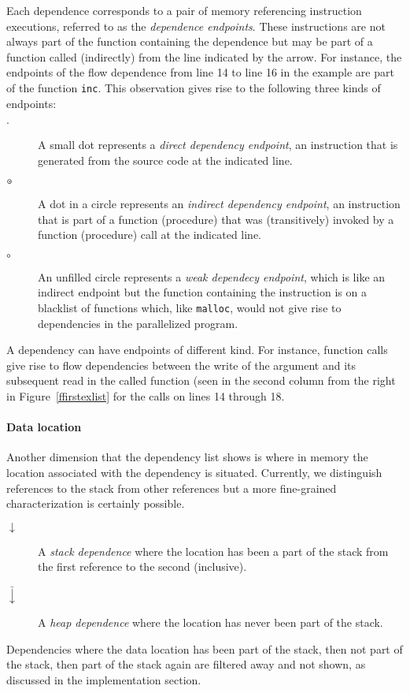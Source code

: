 Each dependence corresponds to a pair of memory referencing 
instruction executions, referred to as the {\em dependence 
endpoints}. These instructions are not always part of the function
containing the dependence but may be part of a function called
(indirectly) from the line indicated by the arrow. For instance, the
endpoints of the flow dependence from line 14 to line 16 in the
example are part of the function {\tt inc}. This observation gives
rise to the following three kinds of endpoints:
\begin{description}
\item[$\cdot\ $] 
A small dot represents a {\em direct dependency endpoint}, an 
instruction that is
generated from the source code at the indicated line. 
\item[$\circ\hskip-0.35em\cdot\ $]
A dot in a circle represents an {\em indirect dependency endpoint},
an instruction that is part of a function (procedure) that was 
(transitively) invoked by a function (procedure) call at the indicated 
line.
\item[$\circ\ $]
An unfilled circle represents a {\em weak dependecy endpoint},
which is like an indirect endpoint but the function containing 
the instruction is on a blacklist of functions which, 
like {\tt malloc}, would not give rise to dependencies in the 
parallelized program.
\end{description}
A dependency can have endpoints of different kind. For instance,
function calls give rise to flow dependencies between the write of the
argument and its subsequent read in the called function (seen in the
second column from the right in Figure~\ref{ffirstexlist} for the
calls on lines 14 through 18.

\paragraph*{Data location}

Another dimension that the dependency list shows is where in memory
the location associated with the dependency is situated. Currently, we
distinguish references to the stack from other references but a more
fine-grained characterization is certainly possible.
\begin{description}
\item[$\downarrow\ $]
A {\em stack dependence} where the location has been a part of 
the stack from the first reference to the second (inclusive).
\item[$\bar{\downarrow}\ $]
A {\em heap dependence} where the location has never been part of the stack.
\end{description}
Dependencies where the data location has been part of the stack, then
not part of the stack, then part of the stack again are filtered away
and not shown, as discussed in the implementation section.

\begin{figure} 
\small

\end{figure}

\begin{figure*} 
\small

\end{figure*}

